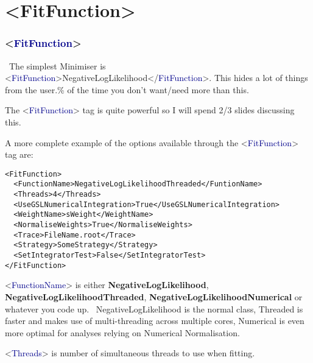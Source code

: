 \documentclass{beamer}
\begin{document}
\section{<FitFunction>}
\begin{frame}[fragile]
\frametitle{<\textcolor{darkblue}{FitFunction}>}
\scriptsize~The simplest Minimiser is <\textcolor{darkblue}{FitFunction}>NegativeLogLikelihood</\textcolor{darkblue}{FitFunction}>. This hides a lot of things from the user.\% of the time you don't want/need more than this.\newline

The <\textcolor{darkblue}{FitFunction}> tag is quite powerful so I will spend 2/3 slides discussing this.\newline

A more complete example of the options available through the <\textcolor{darkblue}{FitFunction}> tag are:

\tiny
\begin{lstlisting}[tabsize=8]
<FitFunction>
  <FunctionName>NegativeLogLikelihoodThreaded</FuntionName>
  <Threads>4</Threads>
  <UseGSLNumericalIntegration>True</UseGSLNumericalIntegration>
  <WeightName>sWeight</WeightName>
  <NormaliseWeights>True</NormaliseWeights>
  <Trace>FileName.root</Trace>
  <Strategy>SomeStrategy</Strategy>
  <SetIntegratorTest>False</SetIntegratorTest>
</FitFunction>
\end{lstlisting}\scriptsize
<\textcolor{darkblue}{FunctionName}> is either \textbf{NegativeLogLikelihood}, \textbf{NegativeLogLikelihoodThreaded}, \textbf{NegativeLogLikelihoodNumerical} or whatever you code up.\newline
\tiny~NegativeLogLikelihood is the normal class, Threaded is faster and makes use of multi-threading across multiple cores, Numerical is even more optimal for analyses relying on Numerical Normalisation.\scriptsize

<\textcolor{darkblue}{Threads}> is number of simultaneous threads to use when fitting.
\end{frame}
\end{document}
